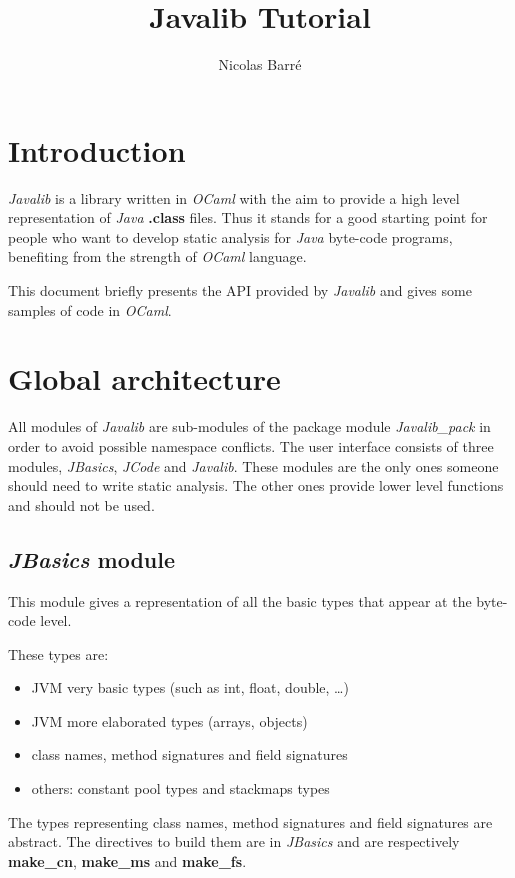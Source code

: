 \documentclass{article}
\title{Javalib Tutorial}
\author{Nicolas Barré}
\begin{document}
\maketitle
\newpage

\tableofcontents
\newpage
\section{Introduction}

\emph{Javalib} is a library written in \emph{OCaml} with the aim to
provide a high level representation of \emph{Java} \textbf{.class}
files. Thus it stands for a good starting point for people who want
to develop static analysis for \emph{Java} byte-code programs,
benefiting from the strength of \emph{OCaml} language.

This document briefly presents the API provided by \emph{Javalib}
and gives some samples of code in \emph{OCaml}.

\section{Global architecture}

All modules of \emph{Javalib} are sub-modules of the package module
\emph{Javalib\_pack} in order to avoid possible namespace
conflicts. The user interface consists of three modules,
\emph{JBasics}, \emph{JCode} and \emph{Javalib}. These modules are
the only ones someone should need to write static analysis. The
other ones provide lower level functions and should not be used.

\subsection{\emph{JBasics} module}

This module gives a representation of all the basic types that
appear at the byte-code level.

These types are:

\begin{itemize}
\item
  JVM very basic types (such as int, float, double, \ldots{})
\item
  JVM more elaborated types (arrays, objects)
\item
  class names, method signatures and field signatures
\item
  others: constant pool types and stackmaps types
\end{itemize}
The types representing class names, method signatures and field
signatures are abstract. The directives to build them are in
\emph{JBasics} and are respectively \textbf{make\_cn},
\textbf{make\_ms} and \textbf{make\_fs}.
\end{document}
